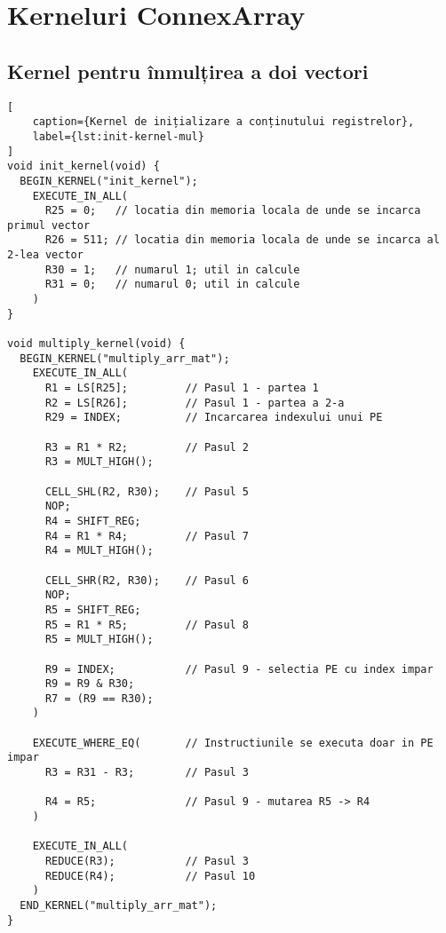 \chapter{Kerneluri ConnexArray}

\section{Kernel pentru înmulțirea a doi vectori}
\label{sec:kernel-mult-arr}
\begin{lstlisting}[
    caption={Kernel de inițializare a conținutului registrelor},
    label={lst:init-kernel-mul}
]
void init_kernel(void) {
  BEGIN_KERNEL("init_kernel");
    EXECUTE_IN_ALL(
      R25 = 0;   // locatia din memoria locala de unde se incarca primul vector
      R26 = 511; // locatia din memoria locala de unde se incarca al 2-lea vector
      R30 = 1;   // numarul 1; util in calcule
      R31 = 0;   // numarul 0; util in calcule
    )
}

void multiply_kernel(void) {
  BEGIN_KERNEL("multiply_arr_mat");
    EXECUTE_IN_ALL(
      R1 = LS[R25];         // Pasul 1 - partea 1
      R2 = LS[R26];         // Pasul 1 - partea a 2-a
      R29 = INDEX;          // Incarcarea indexului unui PE
      
      R3 = R1 * R2;         // Pasul 2
      R3 = MULT_HIGH();

      CELL_SHL(R2, R30);    // Pasul 5
      NOP;
      R4 = SHIFT_REG;
      R4 = R1 * R4;         // Pasul 7
      R4 = MULT_HIGH();

      CELL_SHR(R2, R30);    // Pasul 6
      NOP;
      R5 = SHIFT_REG;
      R5 = R1 * R5;         // Pasul 8
      R5 = MULT_HIGH();

      R9 = INDEX;           // Pasul 9 - selectia PE cu index impar
      R9 = R9 & R30;
      R7 = (R9 == R30);
    )

    EXECUTE_WHERE_EQ(       // Instructiunile se executa doar in PE impar
      R3 = R31 - R3;        // Pasul 3

      R4 = R5;              // Pasul 9 - mutarea R5 -> R4
    )

    EXECUTE_IN_ALL(
      REDUCE(R3);           // Pasul 3
      REDUCE(R4);           // Pasul 10
    )
  END_KERNEL("multiply_arr_mat");
}
\end{lstlisting}



